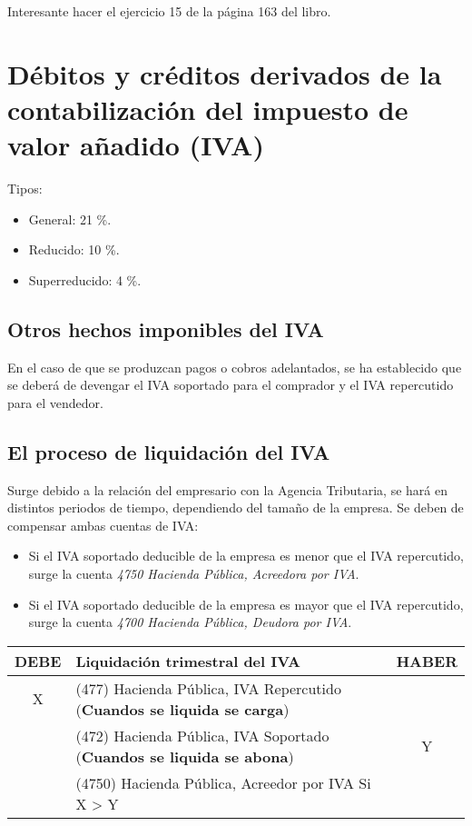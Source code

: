 \documentclass[a4paper,12pt]{article}
\begin{document}
\begin{tcolorbox}[colback=blue!5!white,colframe=green!75!black,fonttitle=\bfseries,title=Ejercicios Recomendados]
    Interesante hacer el ejercicio 15 de la página 163 del libro.
\end{tcolorbox}

\section{Débitos y créditos derivados de la contabilización del impuesto de valor añadido (IVA)}

Tipos:
\begin{itemize}
    \item General: 21 \%.
    \item Reducido: 10 \%.
    \item Superreducido: 4 \%.
\end{itemize}

\subsection{Otros hechos imponibles del IVA}

En el caso de que se produzcan pagos o cobros adelantados, se ha establecido que se deberá de devengar el IVA soportado para el comprador y el IVA repercutido para el vendedor.\\

\subsection{El proceso de liquidación del IVA}

Surge debido a la relación del empresario con la Agencia Tributaria, se hará en distintos periodos de tiempo, dependiendo del tamaño de la empresa. Se deben de compensar ambas cuentas de IVA:
\begin{itemize}
    \item Si el IVA soportado deducible de la empresa es menor que el IVA repercutido, surge la cuenta  \textit{4750 Hacienda Pública, Acreedora por IVA}.
    \item Si el IVA soportado deducible de la empresa es mayor que el IVA repercutido, surge la cuenta \textit{4700 Hacienda Pública, Deudora por IVA}.
\end{itemize}

\begin{table}[H]
    \begin{tabular}{|c|l|c|}
    \hline
    \textbf{DEBE} & \textbf{Liquidación trimestral del IVA} & \textbf{HABER} \\ \hline
    X & (477) Hacienda Pública, IVA Repercutido (\textbf{Cuandos se liquida se carga}) &  \\ \hline
     & (472) Hacienda Pública, IVA Soportado (\textbf{Cuandos se liquida se abona})& Y \\ \hline
     & (4750) Hacienda Pública, Acreedor por IVA Si X > Y &  \\ \hline
    \end{tabular}
\end{table}
\end{document}
